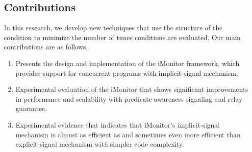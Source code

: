\documentclass[preprint]{sigplanconf}
\begin{document}
\subsection{Contributions}
In this research, we develop new techniques that
use the structure of the condition to minimize the number of 
times conditions are evaluated.
Our main contributions are as follows.
\begin{enumerate}
    \item Presents the design and implementation of the iMonitor framework,
        which provides support for concurrent programs with
        implicit-signal mechanism.
    \item Experimental evaluation of the iMonitor that shows significant
        improvements in performance and scalability with predicate-awareness 
        signaling and relay guarantee. 
    \item Experimental evidence that indicates that iMonitor's implicit-signal
        mechanism is almost as efficient as and sometimes even more efficient
        than explicit-signal mechanism with simpler code complexity.
\end{enumerate}

\end{document}
